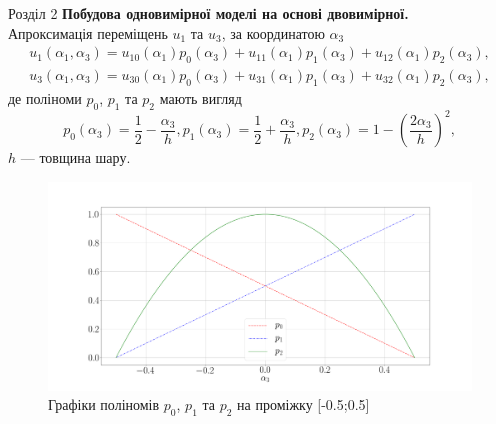 \documentclass[8pt]{beamer}
\numberwithin{figure}{section}
\numberwithin{equation}{section}
\numberwithin{table}{section}
\begin{document}
\begin{frame}{Розділ 2}
\textbf{Побудова одновимірної моделі на основі двовимірної.}
\\
\vspace{1em}
Апроксимація переміщень $u_1$ та $u_3$, за координатою $\alpha_3$ 
\begin{align}
u_1 \left( \alpha_1, \alpha_3 \right) = u_{10} \left( \alpha_1\right)p_0 \left( \alpha_3\right)+u_{11} \left( \alpha_1\right)p_1 \left( \alpha_3\right)+u_{12} \left( \alpha_1\right)p_2 \left( \alpha_3\right),\\
u_3 \left( \alpha_1, \alpha_3 \right) = u_{30} \left( \alpha_1\right)p_0 \left( \alpha_3\right)+u_{31} \left( \alpha_1\right)p_1 \left( \alpha_3\right)+u_{32} \left( \alpha_1\right)p_2 \left( \alpha_3\right),
\end{align}
де поліноми $p_0$, $p_1$ та $p_2$ мають вигляд
\begin{equation}
p_0 \left( \alpha_3\right) = \frac12-\frac{\alpha_3}{h},
p_1 \left( \alpha_3\right) = \frac12+\frac{\alpha_3}{h},
p_2 \left( \alpha_3\right) = 1-\left(\frac{2\alpha_3}{h}\right)^2,
\end{equation}
$h$ --- товщина шару.
\begin{figure}
\includegraphics[scale=0.1]{pic/polin.png}
\caption{Графіки поліномів $p_0$, $p_1$ та $p_2$ на проміжку [-0.5;0.5]}
\end{figure}

\end{frame}
\end{document}
